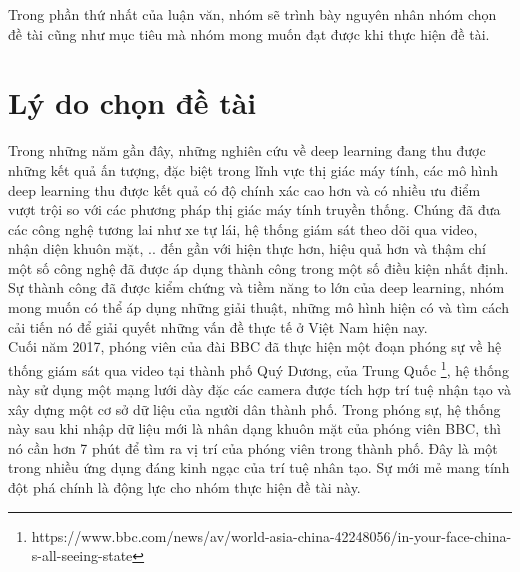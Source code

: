 \documentclass[a4paper]{report}
\begin{document}
Trong phần thứ nhất của luận văn, nhóm sẽ 
trình bày nguyên nhân nhóm chọn đề tài cũng như mục tiêu mà nhóm mong muốn đạt được 
khi thực hiện đề tài.

\section{Lý do chọn đề tài}

	Trong những năm gần đây, những nghiên cứu về deep learning đang thu được
những kết quả ấn tượng, đặc biệt trong lĩnh vực thị giác máy tính, các mô 
hình deep learning thu được kết quả có độ chính xác cao hơn và có nhiều ưu 
điểm vượt trội so với các
phương pháp thị giác máy tính truyền thống. Chúng đã đưa các công nghệ tương lai
 như xe tự lái, hệ thống giám sát theo dõi qua video, nhận diện khuôn mặt, .. đến 
 gần với hiện thực hơn, hiệu quả hơn và thậm chí một số công nghệ đã được áp dụng 
 thành công trong một số điều kiện nhất định. Sự thành công đã được kiểm chứng và 
 tiềm năng to lớn của deep learning, nhóm mong muốn có thể áp dụng những giải thuật, 
 những mô hình hiện có và tìm cách cải tiến nó để giải quyết những vấn đề thực tế ở Việt Nam hiện nay. \\
 
 Cuối năm 2017, phóng viên của đài BBC đã thực hiện một đoạn phóng sự về hệ thống giám sát qua video tại thành phố Quý Dương,
 của Trung Quốc \footnote{https://www.bbc.com/news/av/world-asia-china-42248056/in-your-face-china-s-all-seeing-state}, hệ thống này sử dụng một mạng lưới dày 
 đặc các camera được tích hợp trí tuệ nhận tạo và xây dựng một cơ sở dữ liệu của người dân thành phố. Trong phóng sự, hệ thống 
 này sau khi nhập dữ liệu mới là nhân dạng khuôn mặt của phóng viên BBC, thì nó cần hơn 7
  phút để tìm ra vị trí của phóng viên trong thành phố. Đây là một trong nhiều ứng dụng đáng kinh ngạc 
  của trí tuệ nhân tạo. Sự mới mẻ mang tính đột phá chính là động lực cho nhóm thực hiện đề tài này.\\

\end{document}
